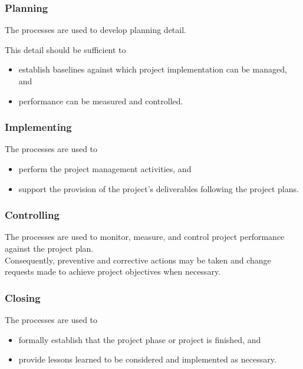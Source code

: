 \documentclass[letterpaper,10pt,english]{jupyterBook}
\begin{document}
\subsubsection{Planning}
\label{\detokenize{PM/pm-processes:planning}}
\sphinxAtStartPar
The  processes are used to develop planning detail.

\sphinxAtStartPar
This detail should be sufficient to
\begin{itemize}
\item {} 
\sphinxAtStartPar
establish baselines against which project implementation can be managed, and

\item {} 
\sphinxAtStartPar
performance can be measured and controlled.

\end{itemize}


\subsubsection{Implementing}
\label{\detokenize{PM/pm-processes:implementing}}
\sphinxAtStartPar
The  processes are used to
\begin{itemize}
\item {} 
\sphinxAtStartPar
perform the project management activities, and

\item {} 
\sphinxAtStartPar
support the provision of the project’s deliverables following the project plans.

\end{itemize}


\subsubsection{Controlling}
\label{\detokenize{PM/pm-processes:controlling}}
\sphinxAtStartPar
The  processes are used to monitor, measure, and control project performance against the project plan. \\
Consequently, preventive and corrective actions may be taken and change requests made to achieve project objectives when necessary.


\subsubsection{Closing}
\label{\detokenize{PM/pm-processes:closing}}
\sphinxAtStartPar
The  processes are used to
\begin{itemize}
\item {} 
\sphinxAtStartPar
formally establish that the project phase or project is finished, and

\item {} 
\sphinxAtStartPar
provide lessons learned to be considered and implemented as necessary.

\end{itemize}
\end{document}
